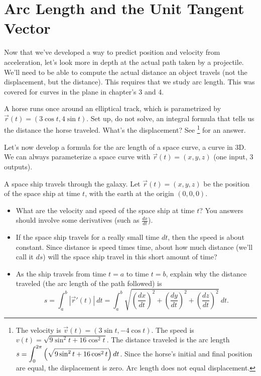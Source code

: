 \section{Arc Length and the Unit Tangent Vector}
Now that we've developed a way to predict position and velocity from acceleration, let's look more in depth at the actual path taken by a projectile. We'll need to be able to compute the actual distance an object travels (not the displacement, but the distance).  This requires that we study arc length.  This was covered for curves in the plane in chapter's 3 and 4. 

\begin{review*}
 A horse runs once around an elliptical track, which is parametrized by $\vec r(t) = (3\cos t,4\sin t)$.  Set up, do not solve, an integral formula that tells us the distance the horse traveled. What's the displacement? See 
\footnote{The velocity is $\vec v(t) = (3\sin t, -4\cos t)$. The speed is $v(t) = \sqrt{9\sin^2t+16\cos^2t}$. The distance traveled is the arc length $\displaystyle s=\int_0^{2\pi} \left(\sqrt{9\sin^2t+16\cos^2t}\right)dt$. Since the horse's initial and final position are equal, the displacement is zero. Arc length does not equal displacement. }
for an answer.
\end{review*}
 

Let's now develop a formula for the arc length of a space curve, a curve in 3D. We can always parameterize a space curve with $\vec r(t) = (x,y,z)$ (one input, 3 outputs).

\begin{problem}
A space ship travels through the galaxy. Let $\vec r(t) = (x,y,z)$ 
%
be the position of the space ship at time $t$, with the earth at the origin $(0,0,0)$. 
\begin{itemize}
 \item What are the velocity and speed of the space ship at time $t$? You answers should involve some derivatives (such as $\frac{dx}{dt}$).
 \item If the space ship travels for a really small time $dt$, then the speed is about constant. Since distance is speed times time, about how much distance (we'll call it $ds$) will the space ship travel in this short amount of time?
 \item As the ship travels from time $t=a$ to time $t=b$, explain why the distance traveled (the arc length of the path followed) is $$s=\int_a^b |\vec r '(t)|\ dt = \int_a^b \sqrt{\left(\frac{dx}{dt}\right)^2+\left(\frac{dy}{dt}\right)^2+\left(\frac{dz}{dt}\right)^2}\ dt .$$
\end{itemize}

\end{problem}

